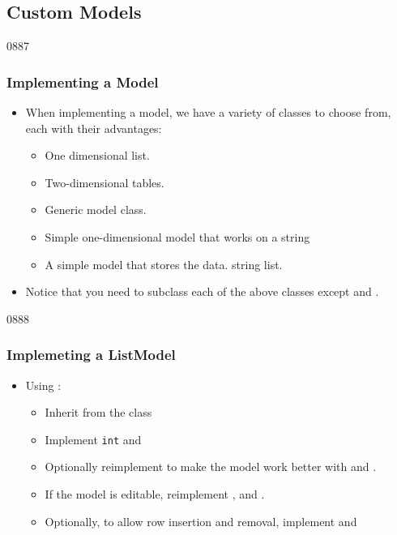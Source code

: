 \subsection{Custom Models}
\begin{slide}{0887}\frametitle{Implementing a Model}\label{model_view_creating_your_own_model}
\begin{itemize}
\item When implementing a model, we have a variety of classes to
  choose from, each with their advantages:
  \begin{itemize}
  \item {} One dimensional list.
  \item {} Two-dimensional tables.
  \item {} Generic model class.
  \item {} Simple one-dimensional model that works on a string
  \item {} A simple model that stores the data.
    string list.
  \end{itemize}
\item Notice that you need to subclass each of the above classes except
   and .
\end{itemize}
\end{slide}

\begin{slide}{0888}\frametitle{Implemeting a ListModel}
\begin{itemize}
\item Using :
  \begin{itemize}
  \item Inherit from the class
  \item Implement \texttt{int}  and
      
  \item Optionally reimplement   to make the
    model work better with  and .
  \item If the model is editable, reimplement   ,
    and .
  \item Optionally, to allow row insertion and removal, implement
     and 
  \end{itemize}
\end{itemize}
\end{slide}

